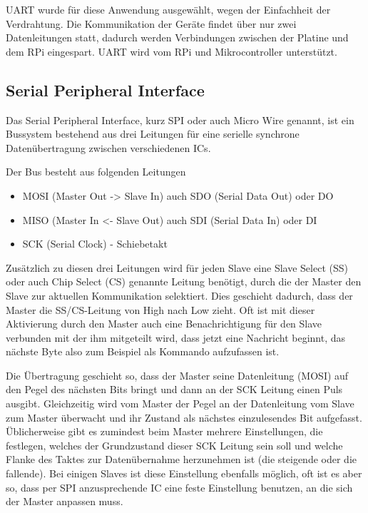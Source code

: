 UART wurde für diese Anwendung ausgewählt, wegen der Einfachheit der Verdrahtung.
Die Kommunikation der Geräte findet über nur zwei Datenleitungen statt, dadurch werden Verbindungen zwischen der Platine und dem RPi eingespart.
UART wird vom RPi und Mikrocontroller unterstützt.


\subsection{Serial Peripheral Interface}
Das Serial Peripheral Interface, kurz SPI oder auch Micro Wire genannt, ist ein Bussystem bestehend aus drei Leitungen für eine serielle synchrone Datenübertragung zwischen verschiedenen ICs. \cite{mikrocontroller-spi}\par

Der Bus besteht aus folgenden Leitungen
\begin{itemize}
	\item MOSI (Master Out -> Slave In) auch SDO (Serial Data Out) oder DO
	\item MISO (Master In <- Slave Out) auch SDI (Serial Data In) oder DI
	\item SCK (Serial Clock) - Schiebetakt	
\end{itemize}
\cite{mikrocontroller-spi}

Zusätzlich zu diesen drei Leitungen wird für jeden Slave eine Slave Select (SS) oder auch Chip Select (CS) genannte Leitung benötigt, durch die der Master den Slave zur aktuellen Kommunikation selektiert. Dies geschieht dadurch, dass der Master die SS/CS-Leitung von High nach Low zieht. Oft ist mit dieser Aktivierung durch den Master auch eine Benachrichtigung für den Slave verbunden mit der ihm mitgeteilt wird, dass jetzt eine Nachricht beginnt, das nächste Byte also zum Beispiel als Kommando aufzufassen ist. \cite{mikrocontroller-spi}\par

Die Übertragung geschieht so, dass der Master seine Datenleitung (MOSI) auf den Pegel des nächsten Bits bringt und dann an der SCK Leitung einen Puls ausgibt. Gleichzeitig wird vom Master der Pegel an der Datenleitung vom Slave zum Master überwacht und ihr Zustand als nächstes einzulesendes Bit aufgefasst. Üblicherweise gibt es zumindest beim Master mehrere Einstellungen, die festlegen, welches der Grundzustand dieser SCK Leitung sein soll und welche Flanke des Taktes zur Datenübernahme herzunehmen ist (die steigende oder die fallende). Bei einigen Slaves ist diese Einstellung ebenfalls möglich, oft ist es aber so, dass per SPI anzusprechende IC eine feste Einstellung benutzen, an die sich der Master anpassen muss. \cite{mikrocontroller-spi}\par

